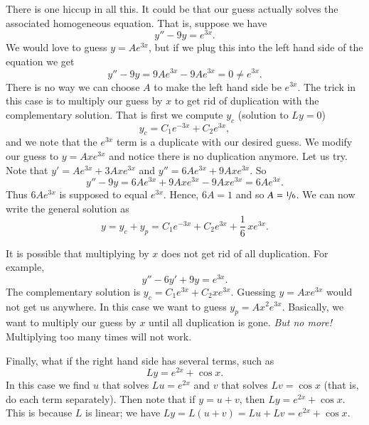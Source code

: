 \medskip

There is one hiccup in all this.  It could be that our guess actually
solves the associated homogeneous equation.  That is, suppose we have
\begin{equation*}
y'' - 9y = e^{3x} .
\end{equation*}
We would love to guess $y = Ae^{3x}$, but if we plug this into the left
hand side of the equation we get
\begin{equation*}
y''-9y = 9Ae^{3x} - 9Ae^{3x} = 0 \not= e^{3x} .
\end{equation*}
There is no way we can choose $A$ to make the left hand side be $e^{3x}$.
The trick in
this case
is to multiply our guess by $x$ to get rid of duplication with the
complementary solution.  That is first we compute $y_c$ (solution to $Ly =
0$)
\begin{equation*}
y_c = C_1 e^{-3x} + C_2 e^{3x} ,
\end{equation*}
and we note that the $e^{3x}$ term is a duplicate with our desired guess.
We modify our guess to $y = Axe^{3x}$ and notice there is no
duplication anymore.  Let us try.  Note that
$y' = Ae^{3x} + 3Axe^{3x}$ and 
$y'' = 6Ae^{3x} + 9Axe^{3x}$.  So
\begin{equation*}
y'' -9y = 6Ae^{3x} + 9Axe^{3x} - 9Axe^{3x} = 
6Ae^{3x} .
\end{equation*}
Thus $6Ae^{3x}$ is supposed to equal $e^{3x}$.  Hence,
$6A = 1$ and so $A=\nicefrac{1}{6}$.  We can now write the general
solution as
\begin{equation*}
y = y_c + y_p = 
C_1 e^{-3x} + C_2 e^{3x} + \frac{1}{6}\,xe^{3x} .
\end{equation*}

\medskip

It is possible that
multiplying by $x$ does not get rid of all
duplication.  For example,
\begin{equation*}
y''-6y'+9y = e^{3x} .
\end{equation*}
The complementary solution is
$y_c = C_1 e^{3x} + C_2 x e^{3x}$.  Guessing $y=A xe^{3x}$
would not get us anywhere.  In this case we want to guess
$y_p = Ax^2e^{3x}$. Basically, we want to multiply our guess by $x$
until all duplication is gone.  \emph{But no more!}  Multiplying too many
times will not work.

\medskip

Finally, what if the right hand side has several terms, such as
\begin{equation*}
Ly = e^{2x} + \cos x .
\end{equation*}
In this case we find $u$ that solves $Lu = e^{2x}$ and $v$ that
solves $Lv = \cos x$ (that is, do each term separately).  Then note
that if $y = u+ v$, then $Ly = e^{2x} + \cos x$.  This is because
$L$ is linear; we have
$Ly = L(u+v) = Lu + Lv = e^{2x} + \cos x$.

